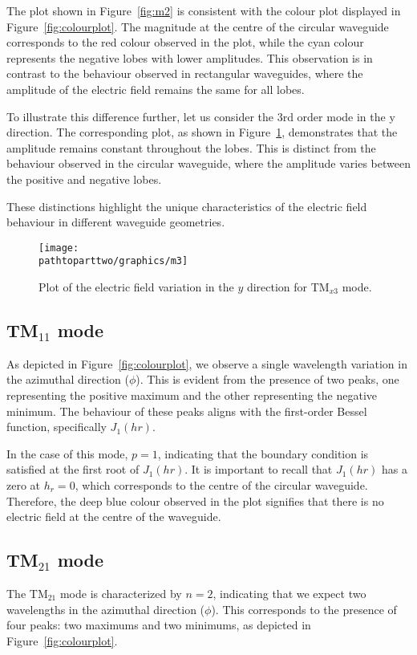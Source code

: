 The plot shown in Figure~\ref{fig:m2} is consistent with the colour plot displayed in Figure~\ref{fig:colourplot}. The magnitude at the centre of the circular waveguide corresponds to the red colour observed in the plot, while the cyan colour represents the negative lobes with lower amplitudes. This observation is in contrast to the behaviour observed in rectangular waveguides, where the amplitude of the electric field remains the same for all lobes.

To illustrate this difference further, let us consider the 3rd order mode in the y direction. The corresponding plot, as shown in Figure~\ref{fig:m3}, demonstrates that the amplitude remains constant throughout the lobes. This is distinct from the behaviour observed in the circular waveguide, where the amplitude varies between the positive and negative lobes.

These distinctions highlight the unique characteristics of the electric field behaviour in different waveguide geometries.
\begin{figure}[h]
\centering
\texttt{[image: \\pathtoparttwo/graphics/m3]}
\caption{Plot of the electric field variation in the $y$ direction for TM$_{x3}$ mode.}
\label{fig:m3}
\end{figure}

\subsection{TM$_{11}$ mode}
As depicted in Figure~\ref{fig:colourplot}, we observe a single wavelength variation in the azimuthal direction ($\phi$). This is evident from the presence of two peaks, one representing the positive maximum and the other representing the negative minimum. The behaviour of these peaks aligns with the first-order Bessel function, specifically $J_1(hr)$.

In the case of this mode, $p=1$, indicating that the boundary condition is satisfied at the first root of $J_1(hr)$. It is important to recall that $J_1(hr)$ has a zero at $h_r=0$, which corresponds to the centre of the circular waveguide. Therefore, the deep blue colour observed in the plot signifies that there is no electric field at the centre of the waveguide.

\subsection{TM$_{21}$ mode}
The TM$_{21}$ mode is characterized by $n=2$, indicating that we expect two wavelengths in the azimuthal direction ($\phi$). This corresponds to the presence of four peaks: two maximums and two minimums, as depicted in Figure~\ref{fig:colourplot}.

